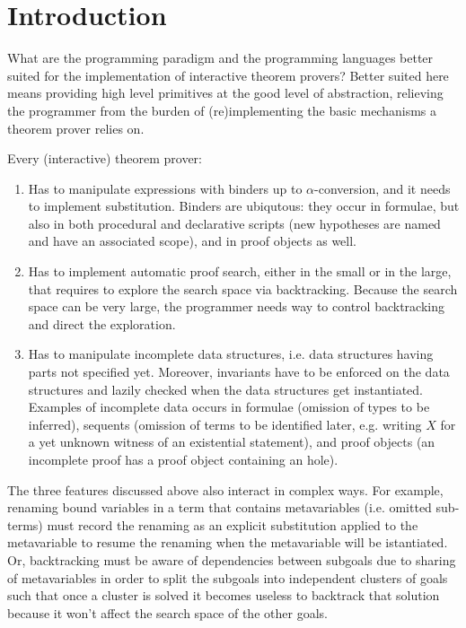 \documentclass[preprint]{sigplanconf}
\begin{document}
\section{Introduction}
What are the programming paradigm and the programming languages better suited for the implementation of interactive theorem provers? Better suited here means providing high level primitives at the good level of abstraction, relieving the programmer from the burden of (re)implementing the basic mechanisms a theorem prover relies on.

Every (interactive) theorem prover:
\begin{enumerate}
\item Has to manipulate expressions with binders up to $\alpha$-conversion, and it needs to implement substitution. Binders are ubiqutous: they occur in formulae, but also in both procedural and declarative scripts (new hypotheses are named and have an associated scope), and in proof objects as well.
\item Has to implement automatic proof search, either in the small or in the large, that requires to explore the search space via backtracking. Because the search space can be very large, the programmer needs way to control backtracking and direct the exploration.
\item Has to manipulate incomplete data structures, i.e. data structures having parts not specified yet. Moreover, invariants have to be enforced on the data structures and lazily checked when the data structures get instantiated. Examples of incomplete data occurs in formulae (omission of types to be inferred), sequents (omission of terms to be identified later, e.g. writing $X$ for a yet unknown witness of an existential statement), and proof objects (an incomplete proof has a proof object containing an hole).
\end{enumerate}

The three features discussed above also interact in complex ways. For example, renaming bound variables in a term that contains metavariables (i.e. omitted sub-terms) must record the renaming as an explicit substitution applied to the metavariable to resume the renaming when the metavariable will be istantiated. Or, backtracking must be aware of dependencies between subgoals due to sharing of metavariables in order to split the subgoals into independent clusters of goals such that once a cluster is solved it becomes useless to backtrack that solution because it won't affect the search space of the other goals.
\end{document}
